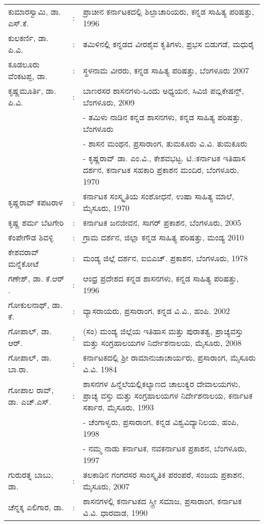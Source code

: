 \begin{longtable}[l]{@{}>{\raggedright}p{4.7cm}cp{9.2cm}<{\raggedright}@{}}
ಕುಮಾರಸ್ವಾಮಿ, ಡಾ. ಎಸ್​.ಕೆ. & : & ಪ್ರಾಚೀನ ಕರ್ನಾಟಕದಲ್ಲಿ ಶಿಲ್ಪಾಚಾರಿಯರು, ಕನ್ನಡ ಸಾಹಿತ್ಯ ಪರಿಷತ್ತು, 1996\\
ಕುಲಕರ್ಣಿ, ಡಾ. ಪಿ.ವಿ. & : & ತಮಿಳಿನಲ್ಲಿ ಕನ್ನಡದ ವೀರಶೈವ ಕೃತಿಗಳು, ಪ್ರಭಸ ಬಿಡುಗಡೆ, ಮಧುರೈ\\
ಕೂಡಲೂರು ವೆಂಕಟಪ್ಪ, ಡಾ. & : &  ಸ್ಥಳನಾಮ ವೀರರು, ಕನ್ನಡ ಸಾಹಿತ್ಯ ಪರಿಷತ್ತು, ಬೆಂಗಳೂರು 2007\\
ಕೃಷ್ಣಮೂರ್ತಿ, ಡಾ. ಪಿ.ವಿ. & : &  ಬಾಣರಸರ ಶಾಸನಗಳು-ಒಂದು ಅಧ್ಯಯನ, ಸಿವಿಜಿ ಪಬ್ಲಿಕೇಷನ್ಸ್​, ಬೆಂಗಳೂರು, 2009\\
                              && - ತಮಿಳು ನಾಡಿನ ಕನ್ನಡ ಶಾಸನಗಳು, ಕನ್ನಡ ಸಾಹಿತ್ಯ ಪರಿಷತ್ತು, ಬೆಂಗಳೂರು\\
               && - ಶಾಸನ ಮಂಥನ, ಪ್ರಸಾರಾಂಗ, ತುಮಕೂರು ವಿ.ವಿ. ತುಮಕೂರು\\
        && - ಕೃಷ್ಣರಾವ್​ ಡಾ. ಎಂ.ವಿ., ಕೇಶವಭಟ್ಟ. ಟಿ.:ಕರ್ನಾಟಕ ಇತಿಹಾಸ ದರ್ಶನ, ಕರ್ನಾಟಕ ಸಹಕಾರಿ ಪ್ರಕಾಶನ ಮಂದಿರ, ಬೆಂಗಳೂರು, 1970\\
ಕೃಷ್ಣರಾವ್​ ಕಪಟರಾಳ & : & ಕರ್ನಾಟಕ ಸಂಸ್ಕೃತಿಯ ಸಂಶೋಧನೆ, ಉಷಾ ಸಾಹಿತ್ಯ ಮಾಲೆ, ಮೈಸೂರು, 1970\\
ಕೃಷ್ಣ ಶರ್ಮ ಬೆಟಗೇರಿ & : & ಕರ್ನಾಟಕ ಜನಜೀವನ, ಸಾಗರ್​ ಪ್ರಕಾಶನ, ಬೆಂಗಳೂರು, 2005\\
ಕೆಂಪೇಗೌಡ ಶಿವಳ್ಳಿ & : & ಗ್ರಾಮ ದರ್ಶನ, ಜಿಲ್ಲಾ ಕನ್ನಡ ಸಾಹಿತ್ಯ ಪರಿಷತ್ತು, ಮಂಡ್ಯ 2010\\
ಕೇಶವರಾವ್​ ಮನ್ನೆಕೋಟೆ & : & ಮಂಡ್ಯ ಜಿಲ್ಲೆ ದರ್ಶನ, ಐಬಿಎಚ್​. ಪ್ರಕಾಶನ, ಬೆಂಗಳೂರು, 1978\\
ಗಣೇಶ್​, ಡಾ. ಕೆ.ಆರ್​. & : & ಆಂಧ್ರ ಪ್ರದೇಶದ ಕನ್ನಡ ಶಾಸನಗಳು, ಕನ್ನಡ ಸಾಹಿತ್ಯ ಪರಿಷತ್ತು, 1996\\
ಗೋಕುಲನಾಥ್​, ಡಾ. ಕೆ. & : &  ವ್ಯಾಸರಾಯರು, ಪ್ರಸಾರಾಂಗ, ಕನ್ನಡ ವಿ.ವಿ., ಹಂಪಿ. 2002\\
ಗೋಪಾಲ್​, ಡಾ. ಆರ್​. & : &  (ಸಂ) ಮಂಡ್ಯ ಜಿಲ್ಲೆಯ ಇತಿಹಾಸ ಮತ್ತು ಪುರಾತತ್ವ, ಪ್ರಾಚ್ಯವಸ್ತು ಮತ್ತು ಸಂಗ್ರಹಾಲಯಗಳ ನಿರ್ದೇಶನಾಲಯ, ಮೈಸೂರು, 2008\\
ಗೋಪಾಲ್​, ಡಾ. ಬಾ.ರಾ. & : & ಕರ್ನಾಟಕದಲ್ಲಿ ಶ‍್ರೀ ರಾಮಾನುಜಾಚಾರ್ಯರು, ಪ್ರಸಾರಾಂಗ, ಮೈಸೂರು ವಿ.ವಿ. 1984\\
ಗೋಪಾಲ ರಾವ್​, ಡಾ. ಎಚ್​.ಎಸ್​. & : & ಶಾಸನಗಳ ಹಿನ್ನೆಲೆಯಲ್ಲಿಕಲ್ಯಾಣದ ಚಾಲುಕ್ಯರ ದೇವಾಲಯಗಳು, ಪ್ರಾಚ್ಯ ವಸ್ತು ಮತ್ತು ಸಂಗ್ರಹಾಲಯಗಳ ನಿರ್ದೇಶನಾಲಯ, ಕರ್ನಾಟಕ ಸರ್ಕಾರ, ಮೈಸೂರು, 1993\\
&& - ಚೆಂಗಾಳ್ವರು, ಪ್ರಸಾರಾಂಗ, ಕನ್ನಡ ವಿಶ್ವವಿದ್ಯಾನಿಲಯ, ಹಂಪಿ, 1998\\
&& - ನಮ್ಮ ನಾಡು ಕರ್ನಾಟಕ, ನವಕರ್ನಾಟಕ ಪ್ರಕಾಶನ, ಬೆಂಗಳೂರು, 1997\\
ಗುರುರತ್ನ ಬಾಬು, ಡಾ. & : &  ತಲಕಾಡಿನ ಗಂಗರಸರ ಸಾಂಸ್ಕೃತಿಕ ಪರಂಪರೆ, ಸಂಜಯ ಪ್ರಕಾಶನ, ಮೈಸೂರು, 2007\\
ಚೆನ್ನಕ್ಕ ಎಲಿಗಾರ, ಡಾ. & : &  ಶಾಸನಗಳಲ್ಲಿ ಕರ್ನಾಟಕದ ಸ್ತ್ರೀ ಸಮಾಜ, ಪ್ರಸಾರಾಂಗ, ಕರ್ನಾಟಕ ವಿ.ವಿ. ಧಾರವಾಡ, 1990\\

\end{longtable}
